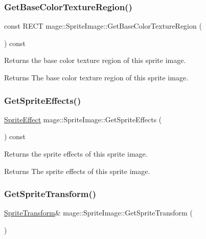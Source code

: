 \subsubsection{\texorpdfstring{Get\+Base\+Color\+Texture\+Region()}{GetBaseColorTextureRegion()}}
{\footnotesize\ttfamily const R\+E\+CT mage\+::\+Sprite\+Image\+::\+Get\+Base\+Color\+Texture\+Region (\begin{DoxyParamCaption}{ }\end{DoxyParamCaption}) const\hspace{0.3cm}{\ttfamily [noexcept]}}

Returns the base color texture region of this sprite image.

\begin{DoxyReturn}{Returns}
The base color texture region of this sprite image. 
\end{DoxyReturn}
\hypertarget{classmage_1_1_sprite_image_a6cfc44918ef3076983e6e1f03de612c8}{}\label{classmage_1_1_sprite_image_a6cfc44918ef3076983e6e1f03de612c8} 
\subsubsection{\texorpdfstring{Get\+Sprite\+Effects()}{GetSpriteEffects()}}
{\footnotesize\ttfamily \hyperlink{namespacemage_a9cfe18123066ba4236f548f9de75d881}{Sprite\+Effect} mage\+::\+Sprite\+Image\+::\+Get\+Sprite\+Effects (\begin{DoxyParamCaption}{ }\end{DoxyParamCaption}) const\hspace{0.3cm}{\ttfamily [noexcept]}}

Returns the sprite effects of this sprite image.

\begin{DoxyReturn}{Returns}
The sprite effects of this sprite image. 
\end{DoxyReturn}
\hypertarget{classmage_1_1_sprite_image_a6293955aa7912f8bf846407ee5d0cfa2}{}\label{classmage_1_1_sprite_image_a6293955aa7912f8bf846407ee5d0cfa2} 
\subsubsection{\texorpdfstring{Get\+Sprite\+Transform()}{GetSpriteTransform()}\hspace{0.1cm}{\footnotesize\ttfamily [1/2]}}
{\footnotesize\ttfamily \hyperlink{classmage_1_1_sprite_transform}{Sprite\+Transform}\& mage\+::\+Sprite\+Image\+::\+Get\+Sprite\+Transform (\begin{DoxyParamCaption}{ }\end{DoxyParamCaption})\hspace{0.3cm}{\ttfamily [noexcept]}}

